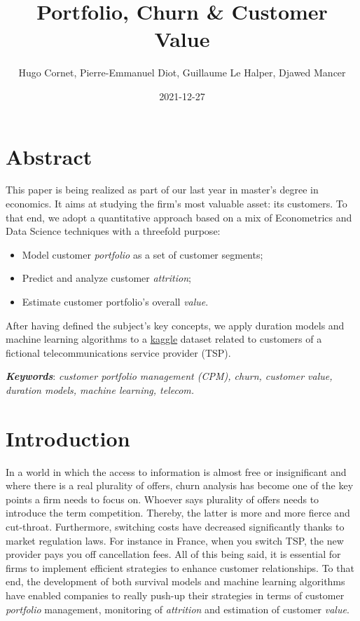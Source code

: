 \documentclass[
]{book}
\title{Portfolio, Churn \& Customer Value}
\author{Hugo Cornet, Pierre-Emmanuel Diot, Guillaume Le Halper, Djawed Mancer}
\date{2021-12-27}
\providecommand{\tightlist}{%
  \setlength{\itemsep}{0pt}\setlength{\parskip}{0pt}}
\begin{document}
\maketitle

{
\setcounter{tocdepth}{1}
\tableofcontents
}
\hypertarget{abstract}{%
\chapter*{Abstract}\label{abstract}}

This paper is being realized as part of our last year in master's degree in economics. It aims at studying the firm's most valuable asset: its customers. To that end, we adopt a quantitative approach based on a mix of Econometrics and Data Science techniques with a threefold purpose:

\begin{itemize}
\tightlist
\item
  Model customer \emph{portfolio} as a set of customer segments;
\item
  Predict and analyze customer \emph{attrition};
\item
  Estimate customer portfolio's overall \emph{value}.
\end{itemize}

After having defined the subject's key concepts, we apply duration models and machine learning algorithms to a \href{https://www.kaggle.com/yeanzc/telco-customer-churn-ibm-dataset}{kaggle} dataset related to customers of a fictional telecommunications service provider (TSP).

\textbf{\emph{Keywords}}: \emph{customer portfolio management (CPM), churn, customer value, duration models, machine learning, telecom.}

\hypertarget{intro}{%
\chapter{Introduction}\label{intro}}

In a world in which the access to information is almost free or insignificant and where there is a real plurality of offers, churn analysis has become one of the key points a firm needs to focus on. Whoever says plurality of offers needs to introduce the term competition. Thereby, the latter is more and more fierce and cut-throat. Furthermore, switching costs have decreased significantly thanks to market regulation laws. For instance in France, when you switch TSP, the new provider pays you off cancellation fees. All of this being said, it is essential for firms to implement efficient strategies to enhance customer relationships. To that end, the development of both survival models and machine learning algorithms have enabled companies to really push-up their strategies in terms of customer \emph{portfolio} management, monitoring of \emph{attrition} and estimation of customer \emph{value}.
\end{document}
